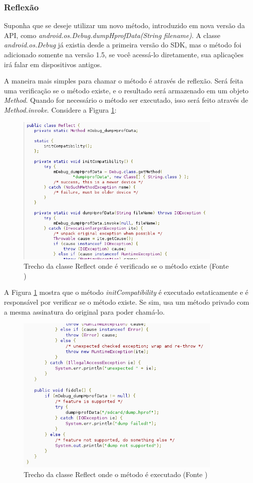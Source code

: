 \subsubsection{Reflexão}

Suponha que se deseje utilizar um novo método, introduzido em nova versão da API,
como {\it android.os.Debug.dumpHprofData(String filename)}. A classe {\it android.os.Debug}
já existia desde a primeira versão do SDK, mas o método foi adicionado somente na versão 
1.5, se você acessá-lo diretamente, sua aplicações irá falar em dispositivos antigos.

A maneira mais simples para chamar o método é através de reflexão. Será feita uma 
verificação se o método existe, e o resultado será armazenado em um objeto {\it Method}.
Quando for necessário o método ser executado, isso será feito através de 
{\it Method.invoke}. Considere a Figura \ref{class_reflect1}:

\begin{figure}[h]
    \centering
    \includegraphics[width=10cm]{img/reflect1}
    \caption{Trecho da classe Reflect onde é verificado se o método existe (Fonte \cite{back_compat})}
    \label{class_reflect1}
\end{figure}

A Figura \ref{class_reflect1} mostra que o método {\it initCompatibility} é executado
 estaticamente e é responsável por verificar se o método existe. Se sim, usa um método 
 privado com a mesma assinatura do original para poder chamá-lo. 

\begin{figure}[h]
    \centering
    \includegraphics[width=10cm]{img/reflect2}
    \caption{Trecho da classe Reflect onde o método é executado (Fonte \cite{back_compat})}
    \label{class_reflect2}
\end{figure}

